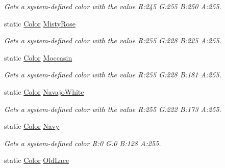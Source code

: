 \begin{DoxyCompactItemize}
\begin{DoxyCompactList}\small\item\em Gets a system-\/defined color with the value R\+:245 G\+:255 B\+:250 A\+:255.\end{DoxyCompactList}\item 
static \hyperlink{structMicrosoft_1_1Xna_1_1Framework_1_1Color}{Color} \hyperlink{structMicrosoft_1_1Xna_1_1Framework_1_1Color_aa47d4468d0d81bca05727d0f38a2c94e}{Misty\+Rose}
\begin{DoxyCompactList}\small\item\em Gets a system-\/defined color with the value R\+:255 G\+:228 B\+:225 A\+:255.\end{DoxyCompactList}\item 
static \hyperlink{structMicrosoft_1_1Xna_1_1Framework_1_1Color}{Color} \hyperlink{structMicrosoft_1_1Xna_1_1Framework_1_1Color_a62f7f3a40f5204f089568b8bd89dd0cd}{Moccasin}
\begin{DoxyCompactList}\small\item\em Gets a system-\/defined color with the value R\+:255 G\+:228 B\+:181 A\+:255.\end{DoxyCompactList}\item 
static \hyperlink{structMicrosoft_1_1Xna_1_1Framework_1_1Color}{Color} \hyperlink{structMicrosoft_1_1Xna_1_1Framework_1_1Color_a11c5534d2855eb0092ae14e8c789b0d4}{Navajo\+White}
\begin{DoxyCompactList}\small\item\em Gets a system-\/defined color with the value R\+:255 G\+:222 B\+:173 A\+:255.\end{DoxyCompactList}\item 
static \hyperlink{structMicrosoft_1_1Xna_1_1Framework_1_1Color}{Color} \hyperlink{structMicrosoft_1_1Xna_1_1Framework_1_1Color_a336d4fbe59ef1896b8e941ade97a009e}{Navy}
\begin{DoxyCompactList}\small\item\em Gets a system-\/defined color R\+:0 G\+:0 B\+:128 A\+:255.\end{DoxyCompactList}\item 
static \hyperlink{structMicrosoft_1_1Xna_1_1Framework_1_1Color}{Color} \hyperlink{structMicrosoft_1_1Xna_1_1Framework_1_1Color_a6fa78cc65c7ea6c0d7ed6535976f6a3e}{Old\+Lace}

\end{DoxyCompactItemize}

